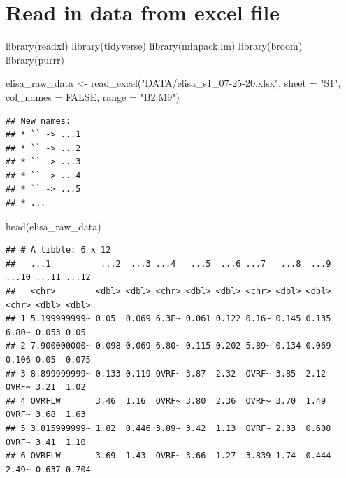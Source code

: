 \documentclass[
]{book}
\newenvironment{Shaded}{\begin{snugshade}}{\end{snugshade}}
\newcommand{\AttributeTok}[1]{\textcolor[rgb]{0.77,0.63,0.00}{#1}}
\newcommand{\ConstantTok}[1]{\textcolor[rgb]{0.00,0.00,0.00}{#1}}
\newcommand{\FunctionTok}[1]{\textcolor[rgb]{0.00,0.00,0.00}{#1}}
\newcommand{\NormalTok}[1]{#1}
\newcommand{\OtherTok}[1]{\textcolor[rgb]{0.56,0.35,0.01}{#1}}
\newcommand{\StringTok}[1]{\textcolor[rgb]{0.31,0.60,0.02}{#1}}
\begin{document}
\hypertarget{read-in-data-from-excel-file}{%
\section{Read in data from excel file}\label{read-in-data-from-excel-file}}

\begin{Shaded}
\begin{Highlighting}[]
\FunctionTok{library}\NormalTok{(readxl)}
\FunctionTok{library}\NormalTok{(tidyverse)}
\FunctionTok{library}\NormalTok{(minpack.lm)}
\FunctionTok{library}\NormalTok{(broom)}
\FunctionTok{library}\NormalTok{(purrr)}
\end{Highlighting}
\end{Shaded}

\begin{Shaded}
\begin{Highlighting}[]
\NormalTok{elisa\_raw\_data }\OtherTok{\textless{}{-}} \FunctionTok{read\_excel}\NormalTok{(}\StringTok{"DATA/elisa\_s1\_07{-}25{-}20.xlsx"}\NormalTok{, }\AttributeTok{sheet =} \StringTok{"S1"}\NormalTok{, }\AttributeTok{col\_names =} \ConstantTok{FALSE}\NormalTok{,  }\AttributeTok{range =} \StringTok{"B2:M9"}\NormalTok{)}
\end{Highlighting}
\end{Shaded}

\begin{verbatim}
## New names:
## * `` -> ...1
## * `` -> ...2
## * `` -> ...3
## * `` -> ...4
## * `` -> ...5
## * ...
\end{verbatim}

\begin{Shaded}
\begin{Highlighting}[]
\FunctionTok{head}\NormalTok{(elisa\_raw\_data)}
\end{Highlighting}
\end{Shaded}

\begin{verbatim}
## # A tibble: 6 x 12
##   ...1          ...2  ...3 ...4   ...5  ...6 ...7   ...8  ...9 ...10 ...11 ...12
##   <chr>        <dbl> <dbl> <chr> <dbl> <dbl> <chr> <dbl> <dbl> <chr> <dbl> <dbl>
## 1 5.199999999~ 0.05  0.069 6.3E~ 0.061 0.122 0.16~ 0.145 0.135 6.80~ 0.053 0.05 
## 2 7.900000000~ 0.098 0.069 6.80~ 0.115 0.202 5.89~ 0.134 0.069 0.106 0.05  0.075
## 3 8.899999999~ 0.133 0.119 OVRF~ 3.87  2.32  OVRF~ 3.85  2.12  OVRF~ 3.21  1.02 
## 4 OVRFLW       3.46  1.16  OVRF~ 3.80  2.36  OVRF~ 3.70  1.49  OVRF~ 3.68  1.63 
## 5 3.815999999~ 1.82  0.446 3.89~ 3.42  1.13  OVRF~ 2.33  0.608 OVRF~ 3.41  1.10 
## 6 OVRFLW       3.69  1.43  OVRF~ 3.66  1.27  3.839 1.74  0.444 2.49~ 0.637 0.704
\end{verbatim}
\end{document}
